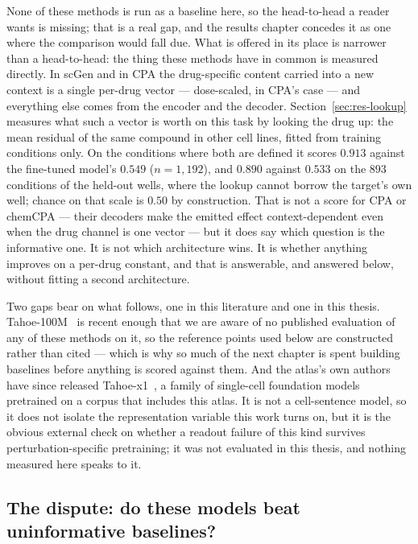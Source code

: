 None of these methods is run as a baseline here, so the head-to-head a reader wants is missing;
that is a real gap, and the results chapter concedes it as one where the comparison would fall due.
What is offered in its place is narrower than a head-to-head: the thing these methods have in
common is measured directly. In scGen and in CPA the drug-specific
content carried into a new context is a single per-drug vector --- dose-scaled, in CPA's case ---
and everything else comes from the encoder and the decoder. Section~\ref{sec:res-lookup} measures
what such a vector is worth on this task by looking the drug up: the mean residual of the same
compound in other cell lines, fitted from training conditions only. On the conditions where both
are defined it scores $0.913$ against the fine-tuned model's $0.549$ ($n = 1{,}192$), and $0.890$
against $0.533$ on the $893$ conditions of the held-out wells, where the lookup cannot
borrow the target's own well; chance on that scale is $0.50$ by construction. That is not a score
for CPA or chemCPA --- their decoders make the emitted effect context-dependent even when the drug
channel is one vector --- but it does say which question is the informative one. It is not which architecture wins. It is whether anything improves on a
per-drug constant, and that is answerable, and answered below, without fitting a second
architecture.

Two gaps bear on what follows, one in this literature and one in this thesis.
Tahoe-100M~\cite{tahoe100m} is recent enough that we are aware of no published evaluation of any of
these methods on it, so the reference points used below are constructed rather than cited --- which
is why so much of the next chapter is spent building baselines before anything is scored against
them. And the atlas's own authors have since released Tahoe-x1~\cite{tahoex1}, a family of
single-cell foundation models pretrained on a corpus that includes this atlas. It is not a
cell-sentence model, so it does not isolate the representation variable this work turns on, but it
is the obvious external check on whether a readout failure of this kind survives
perturbation-specific pretraining; it was not evaluated in this thesis, and nothing measured here
speaks to it.

\subsection{The dispute: do these models beat uninformative baselines?}
\label{sec:lit-dispute}

